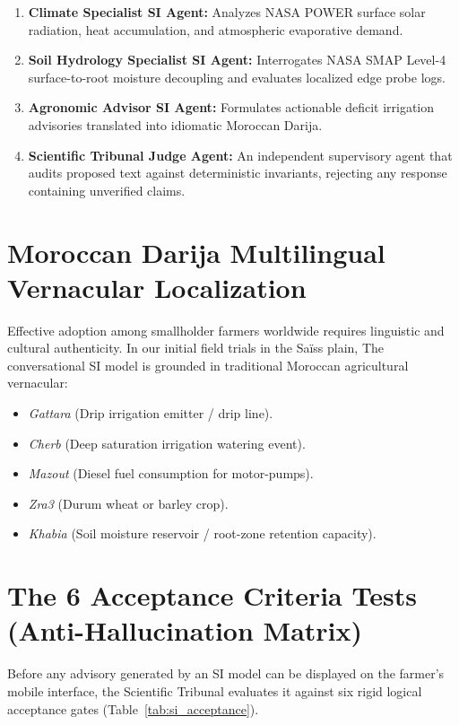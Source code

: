 \documentclass[11pt,a4paper,oneside]{report}
\begin{document}
\begin{enumerate}[leftmargin=*]
    \item \textbf{Climate Specialist SI Agent:} Analyzes NASA POWER surface solar radiation, heat accumulation, and atmospheric evaporative demand.
    \item \textbf{Soil Hydrology Specialist SI Agent:} Interrogates NASA SMAP Level-4 surface-to-root moisture decoupling and evaluates localized edge probe logs.
    \item \textbf{Agronomic Advisor SI Agent:} Formulates actionable deficit irrigation advisories translated into idiomatic Moroccan Darija.
    \item \textbf{Scientific Tribunal Judge Agent:} An independent supervisory agent that audits proposed text against deterministic invariants, rejecting any response containing unverified claims.
\end{enumerate}

\section{Moroccan Darija Multilingual Vernacular Localization}
Effective adoption among smallholder farmers worldwide requires linguistic and cultural authenticity. In our initial field trials in the Saïss plain, The conversational SI model is grounded in traditional Moroccan agricultural vernacular:
\begin{itemize}[leftmargin=*]
    \item \textit{Gattara} (Drip irrigation emitter / drip line).
    \item \textit{Cherb} (Deep saturation irrigation watering event).
    \item \textit{Mazout} (Diesel fuel consumption for motor-pumps).
    \item \textit{Zra3} (Durum wheat or barley crop).
    \item \textit{Khabia} (Soil moisture reservoir / root-zone retention capacity).
\end{itemize}

\section{The 6 Acceptance Criteria Tests (Anti-Hallucination Matrix)}
Before any advisory generated by an SI model can be displayed on the farmer's mobile interface, the Scientific Tribunal evaluates it against six rigid logical acceptance gates (Table~\ref{tab:si_acceptance}).
\end{document}

